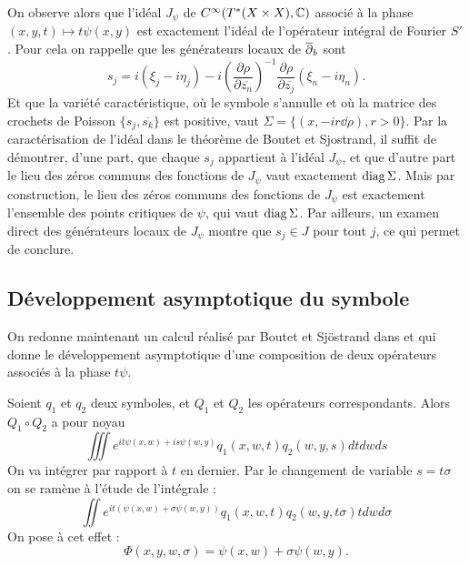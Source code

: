 On observe alors  que l'idéal $J_{\psi}$ de $C^{\infty}(T^*(X\times X), \mathbb{C})$ associé à la phase$(x,y,t)\mapsto t\psi(x,y)$ est exactement l'idéal de l'opérateur intégral de Fourier $S'$. Pour cela on rappelle que les générateurs locaux de $\overline{\partial}_b$ sont
\begin{equation*}
s_j = i(\xi_j - i \eta_j) - i\left(\frac{\partial \rho}{\partial \overline{z_n}}\right)^{-1}\frac{\partial \rho}{\partial \overline{z_j}}(\xi_n - i \eta_n).
\end{equation*}
Et que la variété caractéristique, où le symbole s'annulle et où la matrice des crochets de Poisson $\{s_j,\overline{s_k} \}$ est positive, vaut $\Sigma=\{(x,-ir\dd \rho), r>0\}$. Par la caractérisation de l'idéal dans le théorème de Boutet et Sjostrand, il suffit de démontrer, d'une part, que chaque $s_j$ appartient à l'idéal $J_{\psi}$, et que d'autre part le lieu des zéros communs des fonctions de $J_{\psi}$ vaut exactement $\operatorname{diag} \Sigma$. Mais par construction, le lieu des zéros communs des fonctions de $J_{\psi}$ est exactement l'ensemble des points critiques de $\psi$, qui vaut $\operatorname{diag} \Sigma$. Par ailleurs, un examen direct des générateurs locaux de $J_{\psi}$ montre que $s_j \in J$ pour tout $j$, ce qui permet de conclure.

\subsection{Développement asymptotique du symbole}
On redonne maintenant un calcul réalisé par Boutet et Sjöstrand dans \cite{BoutetdeMonvel1975} et qui donne le développement asymptotique d'une composition de deux opérateurs associés à la phase $t\psi$.

Soient $q_1$ et $q_2$ deux symboles, et $Q_1$ et $Q_2$ les opérateurs correspondants. Alors $Q_1\circ Q_2$ a pour noyau
\begin{equation*}
  \iiint e^{it\psi(x,w)+is\psi(w,y)}q_1(x,w,t)q_2(w,y,s)dtdwds
\end{equation*}
On va intégrer par rapport à $t$ en dernier. Par le changement de variable $s=t\sigma$ on se ramène à l'étude de l'intégrale :
\begin{equation*}
  \iint e^{it(\psi(x,w)+\sigma \psi(w,y))}q_1(x,w,t)q_2(w,y,t\sigma)tdwd\sigma
\end{equation*}
On pose à cet effet :
\begin{equation*}
  \Phi(x,y,w,\sigma)=\psi(x,w)+\sigma \psi(w,y).
\end{equation*}

